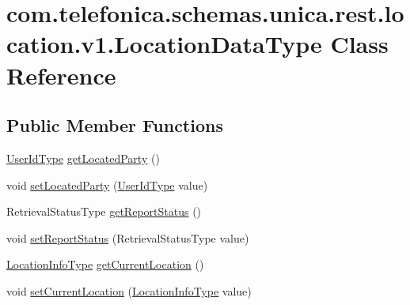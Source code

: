 \hypertarget{classcom_1_1telefonica_1_1schemas_1_1unica_1_1rest_1_1location_1_1v1_1_1LocationDataType}{
\section{com.telefonica.schemas.unica.rest.location.v1.LocationDataType Class Reference}
\label{classcom_1_1telefonica_1_1schemas_1_1unica_1_1rest_1_1location_1_1v1_1_1LocationDataType}
}
\subsection*{Public Member Functions}
\begin{DoxyCompactItemize}
\item 
\hyperlink{classcom_1_1telefonica_1_1schemas_1_1unica_1_1rest_1_1common_1_1v1_1_1UserIdType}{UserIdType} \hyperlink{classcom_1_1telefonica_1_1schemas_1_1unica_1_1rest_1_1location_1_1v1_1_1LocationDataType_a4a59273cff65ae79c10ec009cc1a0446}{getLocatedParty} ()
\item 
void \hyperlink{classcom_1_1telefonica_1_1schemas_1_1unica_1_1rest_1_1location_1_1v1_1_1LocationDataType_a00f137b19a27a92d12575f19b4fa1298}{setLocatedParty} (\hyperlink{classcom_1_1telefonica_1_1schemas_1_1unica_1_1rest_1_1common_1_1v1_1_1UserIdType}{UserIdType} value)
\item 
RetrievalStatusType \hyperlink{classcom_1_1telefonica_1_1schemas_1_1unica_1_1rest_1_1location_1_1v1_1_1LocationDataType_a671258162e5b8fe1e41d9bde8b22841e}{getReportStatus} ()
\item 
void \hyperlink{classcom_1_1telefonica_1_1schemas_1_1unica_1_1rest_1_1location_1_1v1_1_1LocationDataType_a7f0fdc64ce38888b3bd2b27585153675}{setReportStatus} (RetrievalStatusType value)
\item 
\hyperlink{classcom_1_1telefonica_1_1schemas_1_1unica_1_1rest_1_1location_1_1v1_1_1LocationInfoType}{LocationInfoType} \hyperlink{classcom_1_1telefonica_1_1schemas_1_1unica_1_1rest_1_1location_1_1v1_1_1LocationDataType_a06cd4c39bc5b6aca406d67c9b629a605}{getCurrentLocation} ()
\item 
void \hyperlink{classcom_1_1telefonica_1_1schemas_1_1unica_1_1rest_1_1location_1_1v1_1_1LocationDataType_aa11c28aa5134251d7e2e5d669e371de9}{setCurrentLocation} (\hyperlink{classcom_1_1telefonica_1_1schemas_1_1unica_1_1rest_1_1location_1_1v1_1_1LocationInfoType}{LocationInfoType} value)
\end{DoxyCompactItemize}
